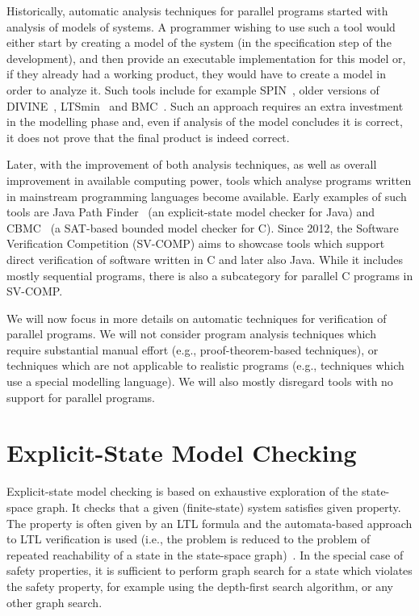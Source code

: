 Historically, automatic analysis techniques for parallel programs started with
analysis of models of systems.
A programmer wishing to use such a tool would either start by creating a model
of the system (in the specification step of the development), and then provide
an executable implementation for this model or, if they already had a working
product, they would have to create a model in order to analyze it.
Such tools include for example SPIN~, older versions of DIVINE~, LTSmin~ and BMC~.
Such an approach requires an extra investment in the modelling phase and, even
if analysis of the model concludes it is correct, it does not prove that the
final product is indeed correct.

Later, with the improvement of both analysis techniques, as well as overall
improvement in available computing power, tools which analyse programs written
in mainstream programming languages become available.
Early examples of such tools are Java Path Finder~ (an explicit-state model checker for Java) and CBMC~ (a SAT-based bounded model checker for C).
Since 2012, the Software Verification Competition (SV-COMP) 
aims to showcase tools which support direct verification of software written in
C and later also Java.
While it includes mostly sequential programs, there is also a subcategory for
parallel C programs in SV-COMP.

We will now focus in more details on automatic techniques for verification of
parallel programs.
We will not consider program analysis techniques which require substantial manual effort (e.g., proof-theorem-based techniques), or techniques which are not applicable to realistic programs (e.g., techniques which use a special modelling language).
We will also mostly disregard tools with no support for parallel programs.

\section{Explicit-State Model Checking}

Explicit-state model checking is based on exhaustive exploration of the
state-space graph.
It checks that a given (finite-state) system satisfies given property.
The property is often given by an LTL formula and the automata-based approach
to LTL verification is used (i.e., the problem is reduced to the problem of
repeated reachability of a state in the state-space graph)~.
In the special case of safety properties, it is sufficient to perform graph
search for a state which violates the safety property, for example using the
depth-first search algorithm, or any other graph search.

